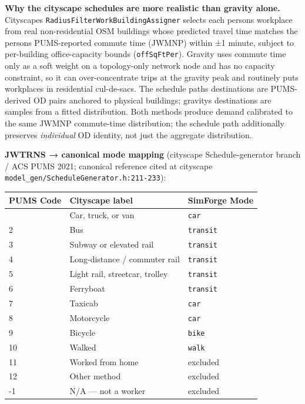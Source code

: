 \textbf{Why the cityscape schedules are more realistic than gravity
alone.} Cityscape\textquotesingle s
\texttt{RadiusFilterWorkBuildingAssigner} selects each
person\textquotesingle s workplace from real non-residential OSM
buildings whose predicted travel time matches the
person\textquotesingle s PUMS-reported commute time (JWMNP) within ±1
minute, subject to per-building office-capacity bounds
(\texttt{offSqFtPer}). Gravity uses commute time only as a soft weight
on a topology-only network node and has no capacity constraint, so it
can over-concentrate trips at the gravity peak and routinely puts
workplaces in residential cul-de-sacs. The schedule
path\textquotesingle s destinations are PUMS-derived OD pairs anchored
to physical buildings; gravity\textquotesingle s destinations are
samples from a fitted distribution. Both methods produce demand
calibrated to the same JWMNP commute-time distribution; the schedule
path additionally preserves \emph{individual} OD identity, not just the
aggregate distribution.

\textbf{JWTRNS → canonical mode mapping} (cityscape Schedule-generator
branch / ACS PUMS 2021; canonical reference cited at cityscape
\texttt{model\_gen/ScheduleGenerator.h:211-233}):

\begin{longtable}[]{@{}lll@{}}
\toprule\noalign{}
PUMS Code & Cityscape label & SimForge Mode \\
\midrule\noalign{}
\endhead
\bottomrule\noalign{}
\endlastfoot
1 & Car, truck, or van & \texttt{car} \\
2 & Bus & \texttt{transit} \\
3 & Subway or elevated rail & \texttt{transit} \\
4 & Long-distance / commuter rail & \texttt{transit} \\
5 & Light rail, streetcar, trolley & \texttt{transit} \\
6 & Ferryboat & \texttt{transit} \\
7 & Taxicab & \texttt{car} \\
8 & Motorcycle & \texttt{car} \\
9 & Bicycle & \texttt{bike} \\
10 & Walked & \texttt{walk} \\
11 & Worked from home & excluded \\
12 & Other method & excluded \\
-1 & N/A --- not a worker & excluded \\
\end{longtable}

